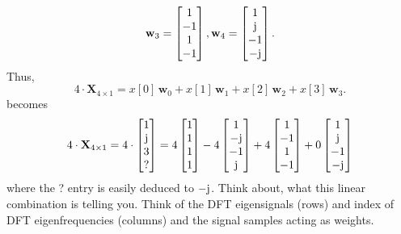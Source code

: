\documentclass[11pt,a4paper,DIV=12]{scrartcl}
\begin{document}
\begin{Loesung}
\begin{enumerate}[label=\alph*)]
\begin{align}
	\mathbf{w}_3 = \begin{bmatrix}1\\-1\\1\\-1\end{bmatrix},
	\mathbf{w}_4 = \begin{bmatrix}1\\\im\\-1\\-\im\end{bmatrix}.
	\end{align}
	Thus,
	\begin{equation}
	4 \cdot \mathbf{X}_{4\times1} = x[0] \, \mathbf{w}_0
	+ x[1] \,\mathbf{w}_1
	+ x[2] \,\mathbf{w}_2
	+ x[3] \,\mathbf{w}_3.
	\end{equation}
	becomes
	\begin{equation}
	 4 \cdot \mathbf{X}_{4\times1} =
	 4 \cdot \begin{bmatrix}1\\\im\\3\\?\end{bmatrix}=
	 4\begin{bmatrix}1\\1\\1\\1\end{bmatrix}
  -4\begin{bmatrix}1\\-\im\\-1\\\im\end{bmatrix}
  +4\begin{bmatrix}1\\-1\\1\\-1\end{bmatrix}
	+0\begin{bmatrix}1\\\im\\-1\\-\im\end{bmatrix}
	\end{equation}
	where the ? entry is easily deduced to $-\im$.
	Think about, what this linear combination is telling you. Think of the
	DFT eigensignals (rows) and index of DFT eigenfrequencies (columns) and the
	signal samples acting as weights.
\end{enumerate}
\end{Loesung}
\end{document}
